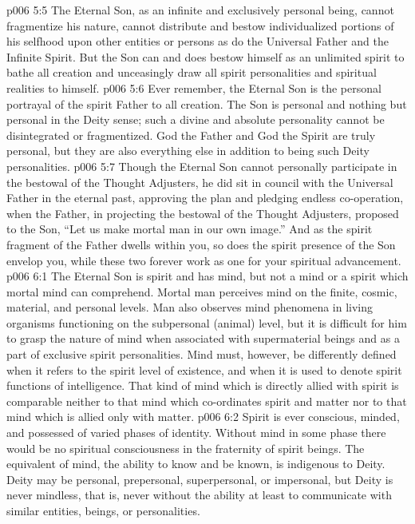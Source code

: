 \vs p006 5:5 The Eternal Son, as an infinite and exclusively personal being, cannot fragmentize his nature, cannot distribute and bestow individualized portions of his selfhood upon other entities or persons as do the Universal Father and the Infinite Spirit. But the Son can and does bestow himself as an unlimited spirit to bathe all creation and unceasingly draw all spirit personalities and spiritual realities to himself.
\vs p006 5:6 Ever remember, the Eternal Son is the personal portrayal of the spirit Father to all creation. The Son is personal and nothing but personal in the Deity sense; such a divine and absolute personality cannot be disintegrated or fragmentized. God the Father and God the Spirit are truly personal, but they are also everything else in addition to being such Deity personalities.
\vs p006 5:7 Though the Eternal Son cannot personally participate in the bestowal of the Thought Adjusters, he did sit in council with the Universal Father in the eternal past, approving the plan and pledging endless co\hyp{}operation, when the Father, in projecting the bestowal of the Thought Adjusters, proposed to the Son, “Let us make mortal man in our own image.” And as the spirit fragment of the Father dwells within you, so does the spirit presence of the Son envelop you, while these two forever work as one for your spiritual advancement.
\vs p006 6:1 The Eternal Son is spirit and has mind, but not a mind or a spirit which mortal mind can comprehend. Mortal man perceives mind on the finite, cosmic, material, and personal levels. Man also observes mind phenomena in living organisms functioning on the subpersonal (animal) level, but it is difficult for him to grasp the nature of mind when associated with supermaterial beings and as a part of exclusive spirit personalities. Mind must, however, be differently defined when it refers to the spirit level of existence, and when it is used to denote spirit functions of intelligence. That kind of mind which is directly allied with spirit is comparable neither to that mind which co\hyp{}ordinates spirit and matter nor to that mind which is allied only with matter.
\vs p006 6:2 Spirit is ever conscious, minded, and possessed of varied phases of identity. Without mind in some phase there would be no spiritual consciousness in the fraternity of spirit beings. The equivalent of mind, the ability to know and be known, is indigenous to Deity. Deity may be personal, prepersonal, superpersonal, or impersonal, but Deity is never mindless, that is, never without the ability at least to communicate with similar entities, beings, or personalities.
